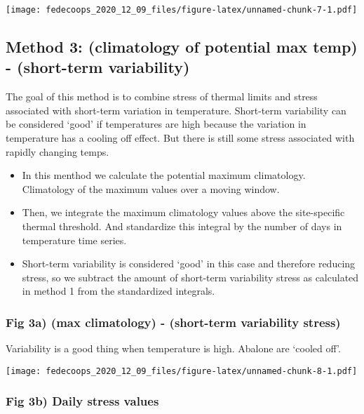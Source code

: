 \documentclass[]{article}
\begin{document}
\texttt{[image: fedecoops\_2020\_12\_09\_files/figure-latex/unnamed-chunk-7-1.pdf]}

\hypertarget{method-3-climatology-of-potential-max-temp---short-term-variability}{%
\subsection{Method 3: (climatology of potential max temp) - (short-term
variability)}\label{method-3-climatology-of-potential-max-temp---short-term-variability}}

The goal of this method is to combine stress of thermal limits and
stress associated with short-term variation in temperature. Short-term
variability can be considered `good' if temperatures are high because
the variation in temperature has a cooling off effect. But there is
still some stress associated with rapidly changing temps.

\begin{itemize}
\item
  In this menthod we calculate the potential maximum climatology.
  Climatology of the maximum values over a moving window.
\item
  Then, we integrate the maximum climatology values above the
  site-specific thermal threshold. And standardize this integral by the
  number of days in temperature time series.
\item
  Short-term variability is considered `good' in this case and therefore
  reducing stress, so we subtract the amount of short-term variability
  stress as calculated in method 1 from the standardized integrals.
\end{itemize}

\hypertarget{fig-3a-max-climatology---short-term-variability-stress}{%
\subsubsection{Fig 3a) (max climatology) - (short-term variability
stress)}\label{fig-3a-max-climatology---short-term-variability-stress}}

Variability is a good thing when temperature is high. Abalone are
`cooled off'.

\texttt{[image: fedecoops\_2020\_12\_09\_files/figure-latex/unnamed-chunk-8-1.pdf]}

\hypertarget{fig-3b-daily-stress-values}{%
\subsubsection{Fig 3b) Daily stress
values}\label{fig-3b-daily-stress-values}}
\end{document}
